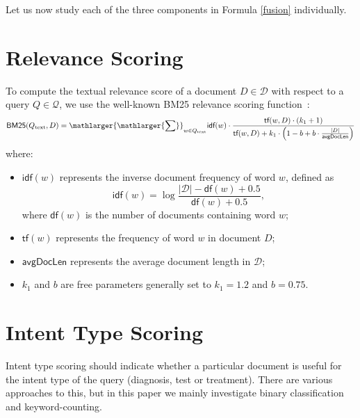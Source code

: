 Let us now study each of the three components in Formula \ref{fusion} individually.

\section{Relevance Scoring}
To compute the textual relevance score of a document $D\in\mathcal{D}$ with respect to a query $Q\in\mathcal{Q}$,
we use the well-known BM25 relevance scoring function~\cite{bm25}:
\begin{equation}\label{bm25-formula}
\textsf{BM25}(Q_{\text{text}},D)
 = \displaystyle\mathlarger{\mathlarger{\sum}}_{w\in Q_{\text{text}}} \textsf{idf}(w)\cdot\displaystyle\frac{\textsf{tf}(w,D)\cdot(k_1+1)}{\textsf{tf}(w,D)+k_1\cdot\left(1-b+b\cdot\frac{|D|}{\textsf{avgDocLen}}\right)}
\end{equation}
where:
\begin{itemize}
 \item $\textsf{idf}(w)$ represents the inverse document frequency of word $w$, defined as
\[\textsf{idf}(w) = \log \displaystyle\frac{|\mathcal{D}|-\textsf{df}(w)+0.5}{\textsf{df}(w)+0.5},\]
where $\textsf{df}(w)$ is the number of documents containing word $w$;
\item $\textsf{tf}(w)$ represents the frequency of word $w$ in document $D$;
\item $\textsf{avgDocLen}$ represents the average document length in $\mathcal{D}$;
\item $k_1$ and $b$ are free parameters generally set to $k_1=1.2$ and $b=0.75$.
\end{itemize}

\section{Intent Type Scoring}\label{intent-scoring}
Intent type scoring should indicate whether a particular document is useful for the intent type of the query
(diagnosis, test or treatment). There are various approaches to this, but in this paper we mainly investigate
binary classification and keyword-counting.

